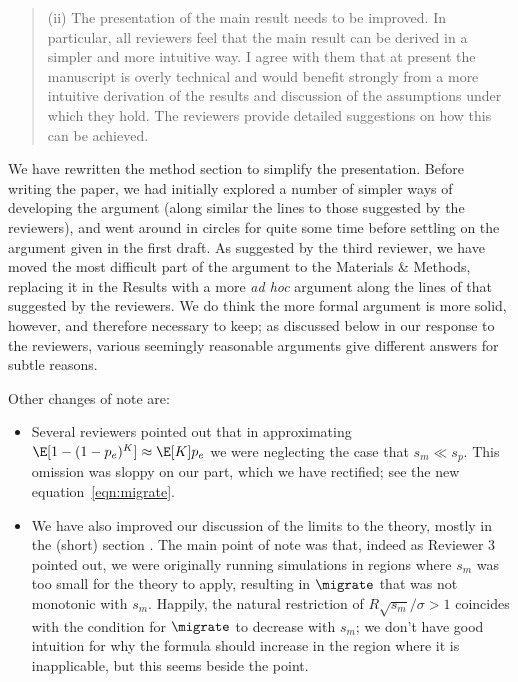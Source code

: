 \begin{quote}
  (ii) The presentation of the main result needs to be improved. In particular,
  all reviewers feel that the main result can be derived in a simpler and more
  intuitive way. I agree with them that at present the manuscript is overly
  technical and would benefit strongly from a more intuitive derivation of the
  results and discussion of the assumptions under which they hold. The reviewers
  provide detailed suggestions on how this can be achieved.
\end{quote}

We have rewritten the method section to simplify the presentation. 
Before writing the paper, we had initially explored a number of simpler ways of developing the
argument (along similar the lines to those suggested by the reviewers), 
and went around in circles for quite some time
before settling on the argument given in the first draft.
As suggested by the third reviewer, 
we have moved the most difficult part of the argument to the Materials \& Methods,
replacing it in the Results with a more \textit{ad hoc} argument
along the lines of that suggested by the reviewers.
We do think the more formal argument is more solid, however,
and therefore necessary to keep; 
as discussed below in our response to the reviewers, various seemingly reasonable arguments
give different answers for subtle reasons.

Other changes of note are:
\begin{itemize}

  \item Several reviewers pointed out that in approximating $\E[1-(1-p_e)^K] \approx \E[K] p_e$
    we were neglecting the case that $s_m \ll s_p$.
    This omission was sloppy on our part,
    which we have rectified; see the new equation~\eqref{eqn:migrate}.

  \item We have also improved our discussion of the limits to the theory,
    mostly in the (short) section .
    The main point of note was that, indeed as Reviewer 3 pointed out,
    we were originally running simulations in regions where $s_m$ was too small for the theory to apply,
    resulting in $\migrate$ that was not monotonic with $s_m$.
    Happily, the natural restriction of $R \sqrt{s_m}/\sigma > 1$ coincides with the condition
    for $\migrate$ to decrease with $s_m$;
    we don't have good intuition for why the formula should increase in the region where it is inapplicable,
    but this seems beside the point.

\end{itemize}

